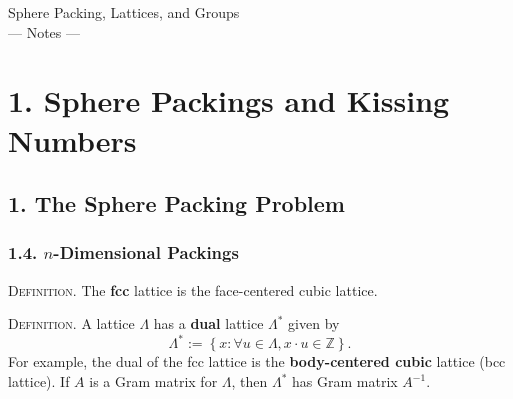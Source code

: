 \documentclass{article}
\newcommand{\Z}{\mathbb{Z}}
\renewcommand{\i}{^{-1}}
\newcommand{\set}[1]{\left\{ #1 \right\}}
\newcommand{\header}[1]{\vspace{1em}\noindent\textsc{#1.} }
\begin{document}
\begin{center}
  {\huge\sc Sphere Packing, Lattices, and Groups}\\[2em]
  {\Large --- Notes ---}
\end{center}

\vspace{4em}

\section*{1. Sphere Packings and Kissing Numbers}

\subsection*{1. The Sphere Packing Problem}

\subsubsection*{1.4. $n$-Dimensional Packings}

\header{Definition}
The \textbf{fcc} lattice is the face-centered cubic lattice.

\header{Definition}
A lattice $\Lambda$ has a \textbf{dual} lattice $\Lambda^*$ given by
$$ \Lambda^* := \set{ x : \forall u \in \Lambda, x \cdot u \in \Z }. $$
For example, the dual of the fcc lattice is the \textbf{body-centered cubic} lattice (bcc lattice).
If $A$ is a Gram matrix for $\Lambda$, then $\Lambda^*$ has Gram matrix $A\i$.
\end{document}
